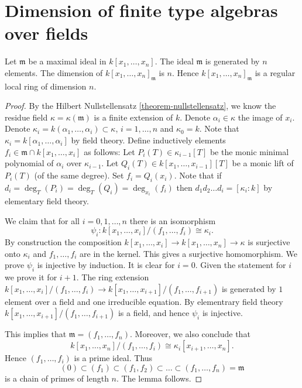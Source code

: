 \section{Dimension of finite type algebras over fields}
\label{section}

\begin{lemma}
\label{lemma-dim-affine-space}
Let $\mathfrak m$ be a maximal ideal in $k[x_1,\ldots,x_n]$.
The ideal $\mathfrak m$ is generated by $n$ elements.
The dimension of $k[x_1,\ldots,x_n]_{\mathfrak m}$ is $n$.
Hence $k[x_1,\ldots,x_n]_{\mathfrak m}$ is a regular local
ring of dimension $n$.
\end{lemma}

\begin{proof}
By the Hilbert Nullstellensatz \ref{theorem-nullstellensatz},
we know the residue field $\kappa = \kappa(\mathfrak m)$ is
a finite extension of $k$. Denote $\alpha_i \in \kappa$ the
image of $x_i$. Denote $\kappa_i = k(\alpha_1,\ldots,\alpha_i)
\subset \kappa$, $i=1,\ldots, n$ and $\kappa_0 = k$.
Note that $\kappa_i = k[\alpha_1,\ldots,\alpha_i]$
by field theory. Define inductively elements
$f_i \in \mathfrak m \cap k[x_1,\ldots,x_i]$
as follows: Let $P_i(T) \in \kappa_{i-1}[T]$
be the monic minimal polynomial of $\alpha_i $ over $\kappa_{i-1}$.
Let $Q_i(T) \in k[x_1,\ldots,x_{i-1}][T]$ be a monic lift of $P_i(T)$
(of the same degree). Set $f_i = Q_i(x_i)$. 
Note that if $d_i = \deg_T(P_i) = \deg_T(Q_i) = \deg_{x_i}(f_i)$
then $d_1d_2\ldots d_i = [\kappa_i : k]$ by elementary field theory.

\medskip\noindent
We claim that for all $i = 0, 1, \ldots, n$ there is an
isomorphism
$$
\psi_i : k[x_1, \ldots, x_i] /(f_1, \ldots, f_i) \cong \kappa_i.
$$
By construction the composition
$k[x_1, \ldots, x_i] \to k[x_1, \ldots, x_n] \to \kappa$
is surjective onto $\kappa_i$ and $f_1, \ldots, f_i$ are
in the kernel. This gives a surjective homomorphism.
We prove $\psi_i$ is injective by induction. It is clear for $i = 0$.
Given the statement for $i$ we prove it for $i + 1$.
The ring extension $k[x_1,\ldots,x_i]/(f_1, \ldots, f_i) \to 
k[x_1,\ldots,x_{i+1}]/(f_1, \ldots, f_{i+1})$
is generated by $1$ element over a field and one
irreducible equation. By elementrary field theory
$k[x_1,\ldots,x_{i+1}]/(f_1, \ldots, f_{i+1})$
is a field, and hence $\psi_i$ is injective.

\medskip\noindent
This implies that $\mathfrak m = (f_1, \ldots, f_n)$.
Moreover, we also conclude that
$$
k[x_1, \ldots, x_n]/(f_1, \ldots, f_i)
\cong 
\kappa_i[x_{i + 1}, \ldots, x_n].
$$
Hence $(f_1, \ldots, f_i)$ is a prime ideal. Thus
$$
(0) \subset (f_1) \subset (f_1, f_2) \subset \ldots \subset
(f_1, \ldots, f_n) = \mathfrak m
$$
is a chain of primes of length $n$. The lemma follows.
\end{proof}

